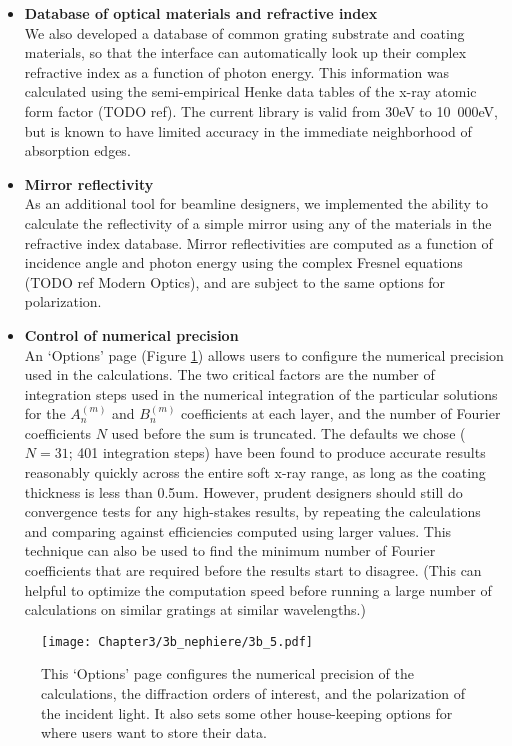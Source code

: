 \begin{itemize}
\item \textbf{Database of optical materials and refractive index}\\
We also developed a database of common grating substrate and coating materials, so that the interface can automatically look up their complex refractive index as a function of photon energy.  This information was calculated using the semi-empirical Henke data tables of the x-ray atomic form factor (TODO ref).  The current library is valid from 30eV to 10~000eV, but is known to have limited accuracy in the immediate neighborhood of absorption edges.

\item \textbf{Mirror reflectivity}\\
As an additional tool for beamline designers, we implemented the ability to calculate the reflectivity of a simple mirror using any of the materials in the refractive index database.  Mirror reflectivities are computed as a function of incidence angle and photon energy using the complex Fresnel equations (TODO ref Modern Optics), and are subject to the same options for polarization.

\item \textbf{Control of numerical precision}\\
An `Options' page (Figure \ref{3b_5}) allows users to configure the numerical precision used in the calculations.  The two critical factors are the number of integration steps used in the numerical integration of the particular solutions for the $A_n^{(m)}$ and $B_n^{(m)}$ coefficients at each layer, and the number of Fourier coefficients $N$ used before the sum is truncated.  The defaults we chose ($N=31$; 401 integration steps) have been found to produce accurate results reasonably quickly across the entire soft x-ray range, as long as the coating thickness is less than 0.5um.   However, prudent designers should still do convergence tests for any high-stakes results, by repeating the calculations and comparing against efficiencies computed using larger values.  This technique can also be used to find the minimum number of Fourier coefficients that are required before the results start to disagree.  (This can helpful to optimize the computation speed before running a large number of calculations on similar gratings at similar wavelengths.)
\end{itemize}

\begin{figure}[p] %
   \centering
   \texttt{[image: Chapter3/3b\_nephiere/3b\_5.pdf]}
   \caption{This `Options' page configures the numerical precision of the calculations, the diffraction orders of interest, and the polarization of the incident light.  It also sets some other house-keeping options for where users want to store their data.}
   \label{3b_5}
\end{figure}

